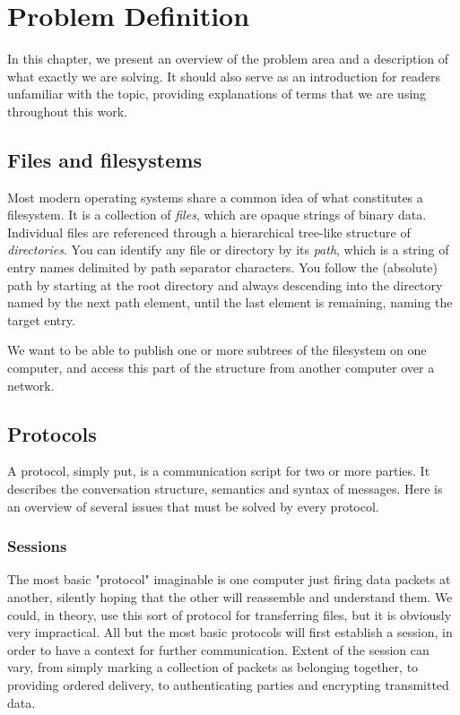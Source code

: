 
\chapter{Problem Definition}

In this chapter, we present an overview of the problem area and a description of what exactly we are solving.
It should also serve as an introduction for readers unfamiliar with the topic, providing explanations of terms
that we are using throughout this work.


\section{Files and filesystems}

Most modern operating systems share a common idea of what constitutes a filesystem. It is a collection of {\it
files}, which are opaque strings of binary data. Individual files are referenced through a hierarchical
tree-like structure of {\it directories}.  You can identify any file or directory by its {\it path}, which is
a string of entry names delimited by path separator characters\footnotemark[1]. You follow the (absolute) path
by starting at the root directory and always descending into the directory named by the next path element,
until the last element is remaining, naming the target entry.

We want to be able to publish one or more subtrees of the filesystem on one computer, and access this part of
the structure from another computer over a network.


\section{Protocols}

A protocol, simply put, is a communication script for two or more parties. It describes the conversation
structure, semantics and syntax of messages. Here is an overview of several issues that must be solved by
every protocol.


\subsection{Sessions}

The most basic "protocol" imaginable is one computer just firing data packets at another, silently hoping that
the other will reassemble and understand them. We could, in theory, use this sort of protocol for transferring
files, but it is obviously very impractical. All but the most basic protocols will first establish a session,
in order to have a context for further communication. Extent of the session can vary, from simply marking
a collection of packets as belonging together, to providing ordered delivery, to authenticating parties and
encrypting transmitted data.

